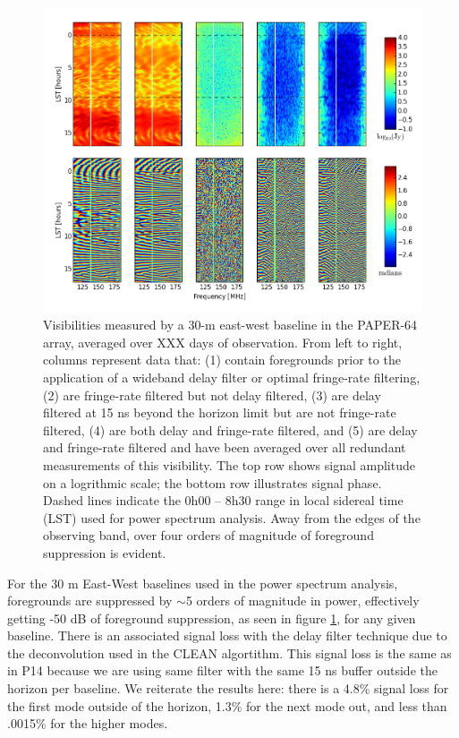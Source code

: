 \documentclass[twocolumn,numberedappendix]{emulateapj} \shorttitle{PSA64}
\begin{document}
\begin{figure}[!t]
\centering
\includegraphics[width=2\columnwidth]{plots/waterfalls.png}
\caption{
Visibilities measured by a 30-m east-west baseline in the PAPER-64 array, 
averaged over XXX days of observation.  From left to right, columns represent
data that: (1) contain foregrounds prior to the application of a wideband
delay filter or optimal fringe-rate filtering, (2) are fringe-rate filtered but
not delay filtered, (3) are delay filtered at 15 ns beyond the horizon limit but
are not fringe-rate filtered, (4) are both delay and fringe-rate filtered,
and (5) are delay and fringe-rate filtered and have been averaged over all
redundant measurements of this visibility.  The top row shows signal amplitude
on a logrithmic scale; the bottom row illustrates signal phase.
Dashed lines indicate the 0h00 -- 8h30 range in local sidereal time (LST) used for power
spectrum analysis.  Away from the edges of the observing band, over four orders 
of magnitude of foreground suppression is evident.
} \label{fig:waterfalls}
\end{figure}

For the 30 m East-West baselines used in the power spectrum analysis,
foregrounds are suppressed by $\sim$5 orders of magnitude in power, effectively
getting -50 dB of foreground suppression, as seen in figure
\ref{fig:waterfalls}, for any given baseline. There is an associated signal loss
with the delay filter technique due to the deconvolution used in the CLEAN
algortithm. This signal loss is the same as in P14 because
we are using same filter with the same 15 ns buffer outside the horizon per
baseline. We reiterate the results here: there is a 4.8\% signal loss for the
first mode outside of the horizon, 1.3\% for the next mode out, and less than
.0015\% for the higher modes.
\end{document}
